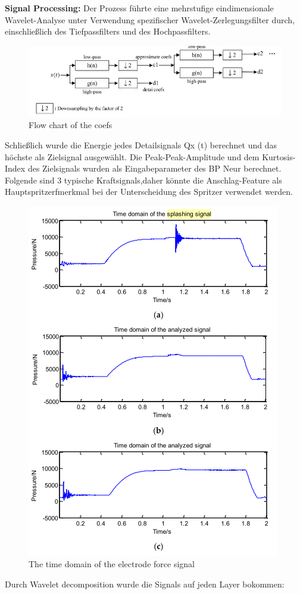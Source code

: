 \documentclass[english,ngerman]{tudscrreprt}
\begin{document}
\textbf{Signal Processing: }
Der Prozess führte eine mehrstufige eindimensionale Wavelet-Analyse unter Verwendung spezifischer Wavelet-Zerlegungsfilter durch, einschließlich des Tiefpassfilters und des Hochpassfilters.
\begin{figure}[H]
\centering
\includegraphics[scale = 0.8]{./Bilder/Flow chart of the coefs.png}
\caption{Flow chart of the coefs}\label{fgg:Wavelets}
\end{figure}
Schließlich wurde die Energie jedes Detailsignals Qx (t) berechnet und das höchste als Zielsignal ausgewählt. Die Peak-Peak-Amplitude und dem Kurtosis-Index des Zielsignals wurden als Eingabeparameter des BP Neur berechnet.
Folgende sind 3 typische Kraftsignals,daher könnte die Anschlag-Feature als Hauptspritzerfmerkmal bei der Unterscheidung des Spritzer verwendet werden.
\begin{figure}[H]
\centering
\includegraphics[scale = 0.8]{./Bilder/The time domain of the electrode force signal.png}
\caption{The time domain of the electrode force signal}\label{fgg:Kraftsg}
\end{figure}
Durch Wavelet decomposition wurde die Signals auf jeden Layer bokommen:
\end{document}
